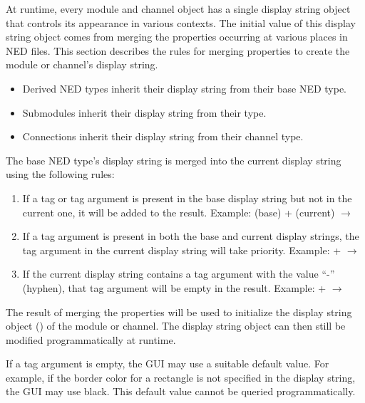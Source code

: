 At runtime, every module and channel object has a single display string object
that controls its appearance in various contexts. The initial value of this
display string object comes from merging the  properties
occurring at various places in NED files. This section describes the rules for
merging  properties to create the module or channel's display
string.

\begin{itemize}
  \item Derived NED types inherit their display string from their base NED type.
  \item Submodules inherit their display string from their type.
  \item Connections inherit their display string from their channel type.
\end{itemize}

The base NED type's display string is merged into the current display string
using the following rules:

\begin{enumerate}
  \item {} If a tag or tag argument is present in the base
    display string but not in the current one, it will be added to the result.
    Example:  (base) +  (current)
    $\rightarrow$ 
  \item {} If a tag argument is present in both the base and
    current display strings, the tag argument in the current display string will
    take priority. Example:  +  $\rightarrow$
  \item {} If the current display string contains a tag argument
    with the value ``-'' (hyphen), that tag argument will be empty in the result.
    Example:  +  $\rightarrow$
\end{enumerate}

The result of merging the  properties will be used to
initialize the display string object () of the
module or channel. The display string object can then still be modified
programmatically at runtime.

\begin{note}
If a tag argument is empty, the GUI may use a suitable default value. For
example, if the border color for a rectangle is not specified in the
display string, the GUI may use black. This default value cannot be
queried programmatically.
\end{note}

